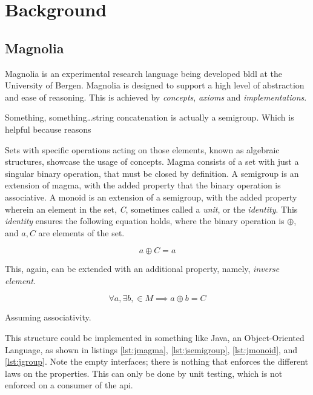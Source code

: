 \chapter{Background}

\section{Magnolia}

Magnolia is an experimental research language being developed \gls{bldl} at the
University of Bergen. Magnolia is designed to support a high level of abstraction
and ease of reasoning. This is achieved by \textit{concepts}, \textit{axioms} and
\textit{implementations}.


Something, something\dots string concatenation is actually a semigroup. Which is
helpful because reasons


Sets with specific operations acting on those elements, known as algebraic
structures, showcase the usage of concepts. Magma consists of a set with just a
singular binary operation, that must be closed by definition. A semigroup is an
extension of magma, with the added property that the binary operation is
associative. A monoid is an extension of a semigroup, with the added property
wherein an element in the set, \textit{C}, sometimes called a \textit{unit}, or
the \textit{identity}. This \textit{identity} ensures the following equation
holds, where the binary operation is $ \oplus $, and $ a, C $ are elements of the set.

\begin{equation}
  a \oplus C = a
\end{equation}

This, again, can be extended with an additional property, namely,
\textit{inverse element}.

\begin{equation}
  \forall a, \exists b, \in M \implies a \oplus b = C
\end{equation}

Assuming associativity.

This structure could be implemented in something like Java, an Object-Oriented
Language, as shown in listings \ref{lst:jmagma}, \ref{lst:jsemigroup},
\ref{lst:jmonoid}, and \ref{lst:jgroup}. Note the empty interfaces; there is
nothing that enforces the different laws on the properties. This can only be
done by unit testing, which is not enforced on a consumer of the \gls{api}.

